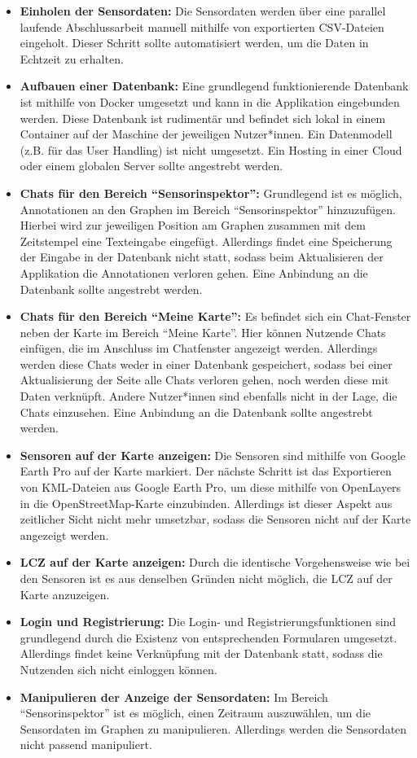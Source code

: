 \begin{itemize}
    \item \textbf{Einholen der Sensordaten:} Die Sensordaten werden über eine parallel laufende Abschlussarbeit manuell mithilfe von exportierten CSV-Dateien eingeholt. Dieser Schritt sollte automatisiert werden, um die Daten in Echtzeit zu erhalten.
    \item \textbf{Aufbauen einer Datenbank:} Eine grundlegend funktionierende Datenbank ist mithilfe von Docker umgesetzt und kann in die Applikation eingebunden werden. Diese Datenbank ist rudimentär und befindet sich lokal in einem Container auf der Maschine der jeweiligen Nutzer*innen. Ein Datenmodell (z.B. für das User Handling) ist nicht umgesetzt. Ein Hosting in einer Cloud oder einem globalen Server sollte angestrebt werden.
    \item \textbf{Chats für den Bereich \enquote{Sensorinspektor}:} Grundlegend ist es möglich, Annotationen an den Graphen im Bereich \enquote{Sensorinspektor} hinzuzufügen. Hierbei wird zur jeweiligen Position am Graphen zusammen mit dem Zeitstempel eine Texteingabe eingefügt. Allerdings findet eine Speicherung der Eingabe in der Datenbank nicht statt, sodass beim Aktualisieren der Applikation die Annotationen verloren gehen. Eine Anbindung an die Datenbank sollte angestrebt werden.
    \item \textbf{Chats für den Bereich \enquote{Meine Karte}:} Es befindet sich ein Chat-Fenster neben der Karte im Bereich \enquote{Meine Karte}. Hier können Nutzende Chats einfügen, die im Anschluss im Chatfenster angezeigt werden. Allerdings werden diese Chats weder in einer Datenbank gespeichert, sodass bei einer Aktualisierung der Seite alle Chats verloren gehen, noch werden diese mit Daten verknüpft. Andere Nutzer*innen sind ebenfalls nicht in der Lage, die Chats einzusehen. Eine Anbindung an die Datenbank sollte angestrebt werden.
    \item \textbf{Sensoren auf der Karte anzeigen:} Die Sensoren sind mithilfe von Google Earth Pro auf der Karte markiert. Der nächste Schritt ist das Exportieren von KML-Dateien aus Google Earth Pro, um diese mithilfe von OpenLayers in die OpenStreetMap-Karte einzubinden. Allerdings ist dieser Aspekt aus zeitlicher Sicht nicht mehr umsetzbar, sodass die Sensoren nicht auf der Karte angezeigt werden.
    \item \textbf{\ac{LCZ} auf der Karte anzeigen:} Durch die identische Vorgehensweise wie bei den Sensoren ist es aus denselben Gründen nicht möglich, die \ac{LCZ} auf der Karte anzuzeigen.
    \item \textbf{Login und Registrierung:} Die Login- und Registrierungsfunktionen sind grundlegend durch die Existenz von entsprechenden Formularen umgesetzt. Allerdings findet keine Verknüpfung mit der Datenbank statt, sodass die Nutzenden sich nicht einloggen können.
    \item \textbf{Manipulieren der Anzeige der Sensordaten:} Im Bereich \enquote{Sensorinspektor} ist es möglich, einen Zeitraum auszuwählen, um die Sensordaten im Graphen zu manipulieren. Allerdings werden die Sensordaten nicht passend manipuliert.
\end{itemize}

